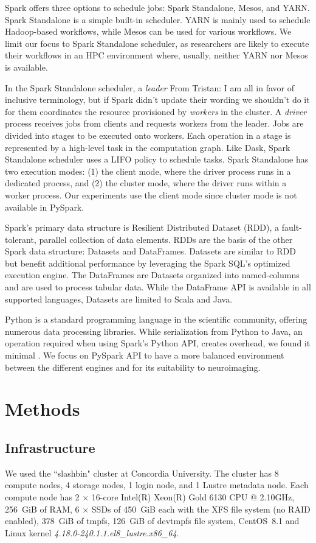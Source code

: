\documentclass[conference]{IEEEtran}
\newcommand{\TG}[1]{\color{cyan}From Tristan: #1 \color{black}}
\begin{document}
Spark offers three options to schedule jobs: Spark Standalone, Mesos, and YARN.
Spark Standalone is a simple built-in scheduler.
YARN is mainly used to schedule Hadoop-based workflows, while Mesos can be used for various workflows.
We limit our focus to Spark Standalone scheduler, as researchers are likely to execute their workflows in an HPC environment where, usually, neither YARN nor Mesos is available.

In the Spark Standalone scheduler, a \textit{leader} \TG{I am all in favor of inclusive terminology, but if Spark didn't update their wording we shouldn't do it for them} coordinates the resource provisioned by \textit{workers} in the cluster.
A \textit{driver}  process receives jobs from clients and requests workers from the leader.
Jobs are divided into stages to be executed onto workers.
Each operation in a stage is represented by a high-level task in the computation graph.
Like Dask, Spark Standalone scheduler uses a LIFO policy to schedule tasks.
Spark Standalone has two execution modes: (1) the client mode, where the driver process runs in a dedicated process,
and (2) the cluster mode, where the driver runs within a worker process.
Our experiments use the client mode since cluster mode is not available in PySpark.

Spark's primary data structure is Resilient Distributed Dataset (RDD)\cite{RDD}, a fault-tolerant, parallel collection of data elements.
RDDs are the basis of the other Spark data structure: Datasets and DataFrames.
Datasets are similar to RDD but benefit additional performance by leveraging the Spark SQL's optimized execution engine. 
The DataFrames are Datasets organized into named-columns and are used to process tabular data. 
While the DataFrame API is available in all supported languages, Datasets are limited to Scala and Java. 

Python is a standard programming language in the scientific community, offering numerous data processing libraries.
While serialization from Python to Java, an operation required when using Spark's Python API, creates overhead, we found it minimal \cite{8943502}.
We focus on PySpark API to have a more balanced environment between the different engines and for its suitability to neuroimaging.

\section{Methods}
\subsection{Infrastructure}
We used the ``slashbin" cluster at Concordia University.
The cluster has 8 compute nodes, 4 storage nodes, 1 login node, and 1
Lustre metadata node. Each
compute node has 2 $\times$ 16-core Intel(R) Xeon(R) Gold 6130 CPU
@ 2.10GHz, 256~GiB of RAM, 6 $\times$ SSDs of 450~GiB each with the XFS
file system (no RAID enabled), 378~GiB of tmpfs, 126~GiB of devtmpfs file system,
CentOS~8.1 and Linux kernel
\textit{4.18.0-240.1.1.el8\_lustre.x86\_64}.
\end{document}
